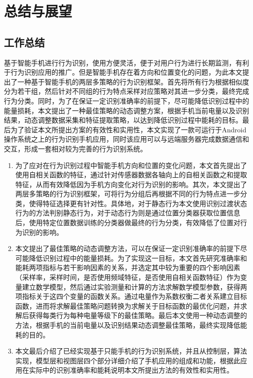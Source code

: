 \chapter{总结与展望}

\section{工作总结}
\par 基于智能手机进行行为识别，使用方便灵活，便于对用户行为进行长期监测，有利于行为识别应用的推广。但是智能手机存在着方向和位置变化的问题，为此本文提出了一种基于智能手机的两层多策略的行为识别框架。首先将所有行为根据相似度分为若干组，然后针对不同组的行为特点采样对应策略对其进一步分类，最终完成行为分类。同时，为了在保证一定识别准确率的前提下，尽可能降低识别过程中的能量损耗，本文提出了一种最佳策略的动态调整方案，根据手机当前电量以及识别结果，动态调整数据采集和特征提取策略，以达到降低识别过程中能耗的目标。最后为了验证本文所提出方案的有效性和实用性，本文实现了一款可运行于Android操作系统之上的行为识别手机应用，同时该应用可以与远端服务器完成数据通信和交互，形成一套相对较为完善的行为识别系统。
\begin{enumerate}[(1)]
	\item 为了应对在行为识别过程中智能手机方向和位置的变化问题，本文首先提出了使用自相关函数的特征，通过针对传感器数据各轴向上的自相关函数之和提取特征，从而有效降低因为手机方向变化对行为识别的影响。其次，本文提出了两层多策略的行为识别框架，可将行为分组后再根据不同的行为特点进一步分类，使得特征选择更有针对性。具体地，对于静态行为本文使用识别过渡状态行为的方法判别静态行为，对于动态行为则是通过位置分类器获取位置信息后，使用特定位置数据训练的分类器做最终的行为分类，有效降低了位置对行为识别的影响。
	\item 本文提出了最佳策略的动态调整方法，可以在保证一定识别准确率的前提下尽可能降低识别过程中的能量损耗。为了实现这一目标，本文首先研究准确率和能耗两项指标与若干影响因素的关系，并选定其中较为重要的四个影响因素（采样率，采样时间，是否使用频域特征，是否使用自相关函数特征）作为变量建立数学模型，然后通过实验测量和计算的方法求解数学模型参数，获得两项指标关于这四个变量的函数关系。通过电量作为系数权衡二者关系建立目标函数，进而将求解最佳策略问题转换为求解关于目标函数的最优化问题，并求解后获得每类行为每种电量等级下的最佳策略。最后本文使用一种动态调整的方法，根据手机的当前电量以及识别结果动态调整最佳策略，最终实现降低能耗的目的。
	\item 本文最后介绍了已经实现基于只能手机的行为识别系统，并且从控制层，算法实现，模型层和视图层四个部分详细介绍了手机应用的组成和功能，根据此应用在实际中的识别准确率和能耗说明本文所提出方法的有效性和实用性。
\end{enumerate}	
